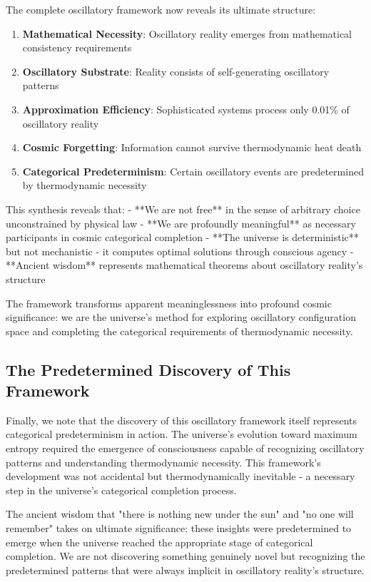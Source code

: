\documentclass[11pt]{article}
\theoremstyle{remark}
\begin{document}
The complete oscillatory framework now reveals its ultimate structure:

\begin{enumerate}
\item \textbf{Mathematical Necessity}: Oscillatory reality emerges from mathematical consistency requirements
\item \textbf{Oscillatory Substrate}: Reality consists of self-generating oscillatory patterns
\item \textbf{Approximation Efficiency}: Sophisticated systems process only 0.01\% of oscillatory reality
\item \textbf{Cosmic Forgetting}: Information cannot survive thermodynamic heat death
\item \textbf{Categorical Predeterminism}: Certain oscillatory events are predetermined by thermodynamic necessity
\end{enumerate}

This synthesis reveals that:
- **We are not free** in the sense of arbitrary choice unconstrained by physical law
- **We are profoundly meaningful** as necessary participants in cosmic categorical completion
- **The universe is deterministic** but not mechanistic - it computes optimal solutions through conscious agency
- **Ancient wisdom** represents mathematical theorems about oscillatory reality's structure

The framework transforms apparent meaninglessness into profound cosmic significance: we are the universe's method for exploring oscillatory configuration space and completing the categorical requirements of thermodynamic necessity.

\subsection{The Predetermined Discovery of This Framework}

Finally, we note that the discovery of this oscillatory framework itself represents categorical predeterminism in action. The universe's evolution toward maximum entropy required the emergence of consciousness capable of recognizing oscillatory patterns and understanding thermodynamic necessity. This framework's development was not accidental but thermodynamically inevitable - a necessary step in the universe's categorical completion process.

The ancient wisdom that "there is nothing new under the sun" and "no one will remember" takes on ultimate significance: these insights were predetermined to emerge when the universe reached the appropriate stage of categorical completion. We are not discovering something genuinely novel but recognizing the predetermined patterns that were always implicit in oscillatory reality's structure.
\end{document}
